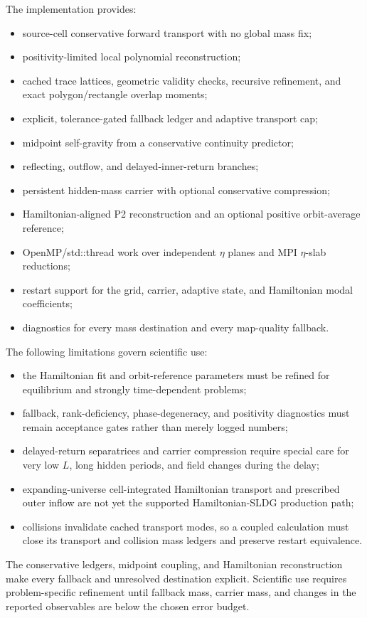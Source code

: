The implementation provides:
\begin{itemize}
\item source-cell conservative forward transport with no global mass fix;
\item positivity-limited local polynomial reconstruction;
\item cached trace lattices, geometric validity checks, recursive refinement,
and exact polygon/rectangle overlap moments;
\item explicit, tolerance-gated fallback ledger and adaptive transport cap;
\item midpoint self-gravity from a conservative continuity predictor;
\item reflecting, outflow, and delayed-inner-return branches;
\item persistent hidden-mass carrier with optional conservative compression;
\item Hamiltonian-aligned P2 reconstruction and an optional positive
orbit-average reference;
\item OpenMP/std::thread work over independent \(\eta\) planes and MPI
\(\eta\)-slab reductions;
\item restart support for the grid, carrier, adaptive state, and Hamiltonian
modal coefficients;
\item diagnostics for every mass destination and every map-quality fallback.
\end{itemize}

The following limitations govern scientific use:
\begin{itemize}
\item the Hamiltonian fit and orbit-reference parameters must be refined for
equilibrium and strongly time-dependent problems;
\item fallback, rank-deficiency, phase-degeneracy, and positivity diagnostics
must remain acceptance gates rather than merely logged numbers;
\item delayed-return separatrices and carrier compression require special
care for very low \(L\), long hidden periods, and field changes during the
delay;
\item expanding-universe cell-integrated Hamiltonian transport and prescribed
outer inflow are not yet the supported Hamiltonian-SLDG production path;
\item collisions invalidate cached transport modes, so a coupled calculation
must close its transport and collision mass ledgers and preserve restart
equivalence.
\end{itemize}

The conservative ledgers, midpoint coupling, and Hamiltonian reconstruction
make every fallback and unresolved destination explicit.  Scientific use
requires problem-specific refinement until fallback mass, carrier mass, and
changes in the reported observables are below the chosen error budget.
